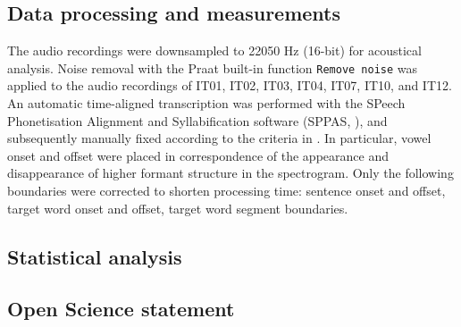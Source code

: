 \documentclass[]{article}
\begin{document}
\subsection{Data processing and
measurements}\label{data-processing-and-measurements}

The audio recordings were downsampled to 22050 Hz (16-bit) for
acoustical analysis. Noise removal with the Praat built-in function
\texttt{Remove\ noise} \citep{boersma2018} was applied to the audio
recordings of IT01, IT02, IT03, IT04, IT07, IT10, and IT12. An automatic
time-aligned transcription was performed with the SPeech Phonetisation
Alignment and Syllabification software (SPPAS, \citealt{bigi2015}), and
subsequently manually fixed according to the criteria in
\citet{machac2009}. In particular, vowel onset and offset were placed in
correspondence of the appearance and disappearance of higher formant
structure in the spectrogram. Only the following boundaries were
corrected to shorten processing time: sentence onset and offset, target
word onset and offset, target word segment boundaries.

\subsection{Statistical analysis}\label{statistical-analysis}

\subsection{Open Science statement}\label{open-science-statement}


\end{document}
